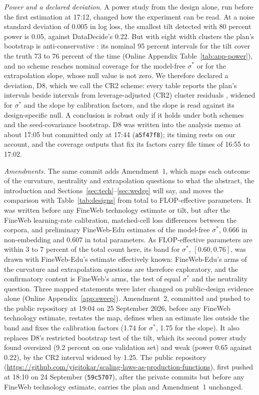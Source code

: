 \textit{Power and a declared deviation.} A power study from the design alone, run before the first estimation at 17:12,
changed how the experiment can be read. At a noise standard deviation of 0.005 in log loss, the smallest tilt detected
with 80 percent power is 0.05, against DataDecide's 0.22. But with eight width clusters the plan's bootstrap is
anti-conservative \citep{mackinnon2018wild}: its nominal 95 percent intervals for the tilt cover the truth 73 to 76
percent of the time (Online Appendix Table~\ref{tab:app-power}), and no scheme reaches nominal coverage for the
model-free $\sigma^*$ or for the extrapolation slope, whose null value is not zero. We therefore declared a deviation, D8, which we call the CR2 scheme: every table reports the plan's
intervals beside intervals from leverage-adjusted (CR2) cluster residuals \citep{bell2002bias}, widened for $\sigma^*$
and the slope by calibration factors, and the slope is read against its design-specific null. A conclusion is robust
only if it holds under both schemes and the seed-covariance bootstrap. D8 was written into the analysis memo at about
17:05 but committed only at 17:44 (\texttt{a5f47f8}); its timing rests on our account, and the coverage outputs that fix
its factors carry file times of 16:55 to 17:02.

\textit{Amendments.} The same commit adds Amendment~1, which maps each outcome of the curvature, neutrality and
extrapolation questions to what the abstract, the introduction and Sections~\ref{sec:tech}--\ref{sec:wedge} will say,
and moves the comparison with Table~\ref{tab:designs} from total to FLOP-effective parameters. It was written before any
FineWeb technology estimate or tilt, but after the FineWeb learning-rate calibration, matched-cell loss differences
between the corpora, and preliminary FineWeb-Edu estimates of the model-free $\sigma^*$, 0.666 in non-embedding and
0.607 in total parameters. As FLOP-effective parameters are within 3 to 7 percent of the total count here, its band for
$\sigma^*$, $[0.60,0.76]$, was drawn with FineWeb-Edu's estimate effectively known: FineWeb-Edu's arms of the curvature
and extrapolation questions are therefore exploratory, and the confirmatory content is FineWeb's arms, the test of equal
$\sigma^*$ and the neutrality question. Three mapped statements were later changed on public-design evidence alone
(Online Appendix~\ref{app:sweep}). Amendment~2, committed and pushed to the public repository at 19:04 on 25 September 2026, before
any FineWeb technology estimate, restates the map, defines when an estimate lies outside the band and fixes the
calibration factors (1.74 for $\sigma^*$, 1.75 for the slope). It also replaces D8's restricted bootstrap test of the
tilt, which its second power study found oversized (9.2 percent on one validation set) and weak (power 0.65 against
0.22), by the CR2 interval widened by 1.25. The public repository
(\url{https://github.com/yigitokar/scaling-laws-as-production-functions}), first pushed at 18:10 on 24 September
(\texttt{59c5707}), after the private commits but before any FineWeb technology estimate, carries the plan and
Amendment~1 unchanged.

